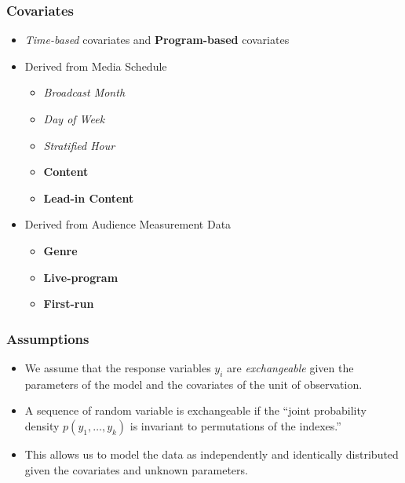 \documentclass{beamer}
\begin{document}
\begin{frame}
\frametitle{Covariates}
\begin{itemize}
  \item \emph{Time-based} covariates and \textbf{Program-based} covariates
  \pause
  \item Derived from Media Schedule
    \begin{itemize}
      \item \emph{Broadcast Month}
      \item \emph{Day of Week}
      \item \emph{Stratified Hour}
      \item \textbf{Content}
      \item \textbf{Lead-in Content}
    \end{itemize}
  \pause
  \item Derived from Audience Measurement Data
    \begin{itemize}
      \item \textbf{Genre}
      \item \textbf{Live-program}
      \item \textbf{First-run}
    \end{itemize}

\end{itemize}

\end{frame}

\begin{frame}
\frametitle{Assumptions}
\begin{itemize}
  \item We assume that the response variables $y_i$ are \emph{exchangeable} given the parameters of the model
  and the covariates of the unit of observation.

  \pause
  \item A sequence of random variable is exchangeable if the ``joint probability density $p(y_1, \dots, y_k)$ is invariant to permutations of the indexes.''
  \pause
  \item This allows us to model the data as independently and identically distributed given the covariates and unknown parameters.

\end{itemize}
\end{frame}
\end{document}
